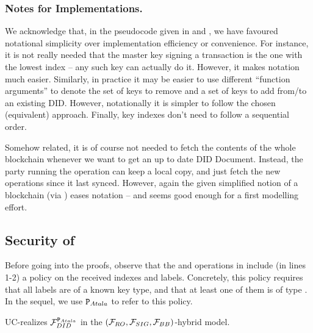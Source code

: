 \subsubsection{Notes for Implementations.} %

We acknowledge that, in the pseudocode given in  and
, we have favoured notational simplicity over
implementation efficiency or
convenience. For instance, it is not really needed that the master key signing a
transaction is the one with the lowest index -- any such key can actually do it.
However, it makes notation much easier. Similarly, in practice it may be easier
to use different ``function arguments'' to denote the set of keys to remove and
a set of keys to add from/to an existing DID. However, notationally it is
simpler to follow the chosen (equivalent) approach. Finally, key indexes don't
need to follow a sequential order.

Somehow related, it is of course not needed to fetch the contents of the whole
blockchain whenever we want to get an up to date DID Document. Instead, the
party running the operation can keep a local copy, and just fetch the new
operations since it last synced. However, again the given simplified notion of
a blockchain (via \IdealFaobb) eases notation -- and seems good enough for a
first modelling effort.

\subsection{Security of \RealPKIDIDAtala}
\label{ssec:sec-didatala}

Before going into the proofs, observe that the  and 
operations in \RealPKIDIDAtala include (in lines 1-2) a policy on the received
indexes and labels. Concretely, this policy requires that all labels are of a
known key type, and that at least one of them is of type \MasterKey. In the
sequel, we use $\P_{Atala}$ to refer to this policy.

\begin{theorem}
  \label{thm:sec-didatala}
  \RealPKIDIDAtala UC-realizes $\IdealFPKIDID^{\P_{Atala}}$ in the $(\IdealFRO,
  \IdealFSig, \IdealFaobb)$-hybrid model.
\end{theorem}

